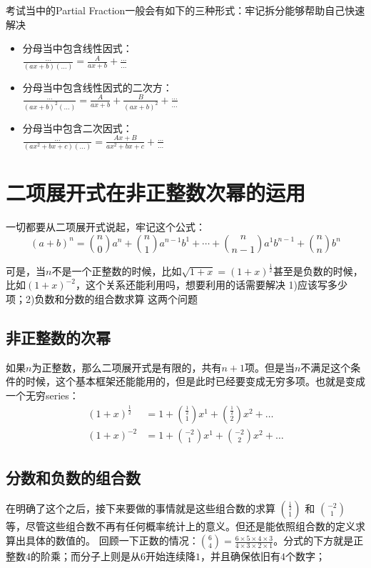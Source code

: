 考试当中的Partial Fraction一般会有如下的三种形式：牢记拆分能够帮助自己快速解决
\begin{SummBox}
 \begin{itemize}
 	\item 分母当中包含线性因式：\\$\frac{\ldots}{(ax+b)(\ldots)}=\frac{A}{ax+b}+\frac{\ldots}{\ldots}$
 	\item 分母当中包含线性因式的二次方：\\$\frac{\ldots}{(ax+b)^2(\ldots)}=\frac{A}{ax+b}+\frac{B}{(ax+b)^2}+\frac{\ldots}{\ldots}$
 	\item 分母当中包含二次因式：\\$\frac{\ldots}{(ax^2+bx+c)(\ldots)}=\frac{Ax+B}{ax^2+bx+c}+\frac{\ldots}{\ldots}$
 \end{itemize}
\end{SummBox}
\clearpage

\section{二项展开式在非正整数次幂的运用}
一切都要从二项展开式说起，牢记这个公式：
\[
	(a+b)^n={n\choose 0}a^n+{n\choose 1}a^{n-1}b^1+\cdots+{n\choose n-1}a^1b^{n-1}+{n\choose n}b^n
\]

可是，当$n$不是一个正整数的时候，比如$\sqrt{1+x}=(1+x)^{\frac{1}{2}}$甚至是负数的时候，比如$(1+x)^{-2}$，这个关系还能利用吗，想要利用的话需要解决 1)应该写多少项；2)负数和分数的组合数求算 这两个问题
\subsection*{非正整数的次幂}
如果$n$为正整数，那么二项展开式是有限的，共有$n+1$项。但是当$n$不满足这个条件的时候，这个基本框架还能能用的，但是此时已经要变成无穷多项。也就是变成一个无穷\gls{series}：
\begin{align*}
	(1+x)^\frac{1}{2} &=1+{\frac{1}{2}\choose 1}x^1+{\frac{1}{2}\choose 2}x^2+\ldots\\
	(1+x)^{-2} &=1+{-2\choose 1}x^1+{-2\choose 2}x^2+\ldots
\end{align*}

\subsection*{分数和负数的组合数}
在明确了这个之后，接下来要做的事情就是这些组合数的求算 ${\frac{1}{2} \choose 1}$ 和 ${-2 \choose 1}$等，尽管这些组合数不再有任何概率统计上的意义。但还是能依照组合数的定义求算出具体的数值的。
回顾一下正数的情况：${6\choose 4} = \frac{6\times 5\times 4\times 3}{4\times 3\times 2\times 1}$。分式的下方就是正整数$4$的阶乘；而分子上则是从$6$开始连续降$1$，并且确保依旧有$4$个数字；

